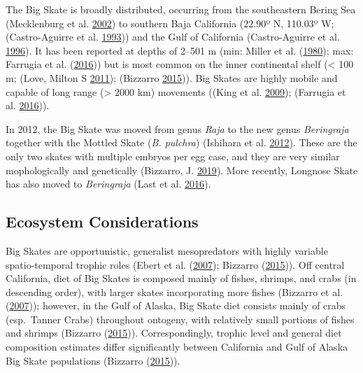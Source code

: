 \documentclass[12pt,]{article}
\begin{document}
The Big Skate is broadly distributed, occurring from the southeastern
Bering Sea (Mecklenburg et al.
\protect\hyperlink{ref-Mecklenburg2002}{2002}) to southern Baja
California (22.90º N, 110.03º W; (Castro-Aguirre et al.
\protect\hyperlink{ref-Castro1993}{1993})) and the Gulf of California
(Castro-Aguirre et al. \protect\hyperlink{ref-Castro1996}{1996}). It has
been reported at depths of 2--501 m (min: Miller et al.
(\protect\hyperlink{ref-Miller1980}{1980}); max: Farrugia et al.
(\protect\hyperlink{ref-Farrugia2016}{2016})) but is most common on the
inner continental shelf (\textless{} 100 m; (Love, Milton S
\protect\hyperlink{ref-Love2011}{2011}); (Bizzarro
\protect\hyperlink{ref-Bizzarro2015}{2015})). Big Skates are highly
mobile and capable of long range (\textgreater{} 2000 km) movements
((King et al. \protect\hyperlink{ref-KingandMcF2009}{2009}); (Farrugia
et al. \protect\hyperlink{ref-Farrugia2016}{2016})).

In 2012, the Big Skate was moved from genus \emph{Raja} to the new genus
\emph{Beringraja} together with the Mottled Skate (\emph{B. pulchra})
(Ishihara et al. \protect\hyperlink{ref-Ishihara2012}{2012}). These are
the only two skates with multiple embryos per egg case, and they are
very similar mophologically and genetically (Bizzarro, J.
\protect\hyperlink{ref-Bizzarro2019}{2019}). More recently, Longnose
Skate has also moved to \emph{Beringraja} (Last et al.
\protect\hyperlink{ref-Last2016}{2016}).

\hypertarget{ecosystem-considerations-1}{%
\subsection{Ecosystem Considerations}\label{ecosystem-considerations-1}}

Big Skates are opportunistic, generalist mesopredators with highly
variable spatio-temporal trophic roles (Ebert et al.
(\protect\hyperlink{ref-Ebert2007}{2007}); Bizzarro
(\protect\hyperlink{ref-Bizzarro2015}{2015})). Off central California,
diet of Big Skates is composed mainly of fishes, shrimps, and crabs (in
descending order), with larger skates incorporating more fishes
(Bizzarro et al. (\protect\hyperlink{ref-Bizzarro2007}{2007})); however,
in the Gulf of Alaska, Big Skate diet consists mainly of crabs
(esp.~Tanner Crabs) throughout ontogeny, with relatively small portions
of fishes and shrimps (Bizzarro
(\protect\hyperlink{ref-Bizzarro2015}{2015})). Correspondingly, trophic
level and general diet composition estimates differ significantly
between California and Gulf of Alaska Big Skate populations (Bizzarro
(\protect\hyperlink{ref-Bizzarro2015}{2015})).
\end{document}
